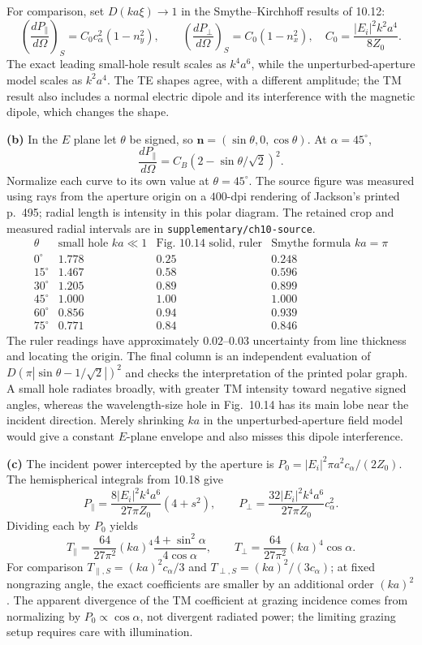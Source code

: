 For comparison, set $D(ka\xi)\to1$ in the Smythe--Kirchhoff results
of 10.12:
\[
\left(\frac{dP_\parallel}{d\Omega}\right)_{\!S}
=C_0 c_\alpha^2(1-n_y^2),\qquad
\left(\frac{dP_\perp}{d\Omega}\right)_{\!S}
=C_0(1-n_x^2),\quad C_0=\frac{|E_i|^2k^2a^4}{8Z_0}.
\]
The exact leading small-hole result scales as $k^4a^6$, while the
unperturbed-aperture model scales as $k^2a^4$. The TE shapes agree,
with a different amplitude; the TM result also includes a normal
electric dipole and its interference with the magnetic dipole, which
changes the shape.

\textbf{(b)} In the $E$ plane let $\theta$ be signed, so
$\mathbf n=(\sin\theta,0,\cos\theta)$. At $\alpha=45^\circ$,
\[
\frac{dP_\parallel}{d\Omega}
=C_B(2-\sin\theta/\sqrt2)^2.
\]
Normalize each curve to its own value at $\theta=45^\circ$.
The source figure was measured using rays from the aperture origin on
a $400$-dpi rendering of Jackson's printed p.~495; radial length is
intensity in this polar diagram. The retained crop and measured radial
intervals are in \texttt{supplementary/ch10-source}.
\[
\begin{array}{r|rrr}
\theta&
\text{small hole }ka\ll1&
\text{Fig.~10.14 solid, ruler}&
\text{Smythe formula }ka=\pi\\ \hline
0^\circ&1.778&0.25&0.248\\
15^\circ&1.467&0.58&0.596\\
30^\circ&1.205&0.89&0.899\\
45^\circ&1.000&1.00&1.000\\
60^\circ&0.856&0.94&0.939\\
75^\circ&0.771&0.84&0.846
\end{array}
\]
The ruler readings have approximately $0.02$--$0.03$ uncertainty
from line thickness and locating the origin. The final column is an
independent evaluation of
$D(\pi|\sin\theta-1/\sqrt2|)^2$ and checks the interpretation of
the printed polar graph. A small hole radiates broadly, with greater
TM intensity toward negative signed angles, whereas the wavelength-size
hole in Fig.~10.14 has its main lobe near the incident direction.
Merely shrinking $ka$ in the unperturbed-aperture field model would
give a constant $E$-plane envelope and also misses this dipole interference.

\textbf{(c)} The incident power intercepted by the aperture is
$P_0=|E_i|^2\pi a^2c_\alpha/(2Z_0)$.
The hemispherical integrals from 10.18 give
\[
P_\parallel=\frac{8|E_i|^2 k^4a^6}{27\pi Z_0}(4+s^2),\qquad
P_\perp=\frac{32|E_i|^2 k^4a^6}{27\pi Z_0}c_\alpha^2 .
\]
Dividing each by $P_0$ yields
\[
\boxed{T_\parallel=\frac{64}{27\pi^2}(ka)^4
\frac{4+\sin^2\alpha}{4\cos\alpha},\qquad
T_\perp=\frac{64}{27\pi^2}(ka)^4\cos\alpha .}
\]
For comparison $T_{\parallel,S}=(ka)^2c_\alpha/3$ and
$T_{\perp,S}=(ka)^2/(3c_\alpha)$; at fixed nongrazing angle, the
exact coefficients are smaller by an additional order $(ka)^2$.
The apparent divergence of the TM coefficient at grazing incidence
comes from normalizing by $P_0\propto\cos\alpha$, not divergent radiated
power; the limiting grazing setup requires care with illumination.

